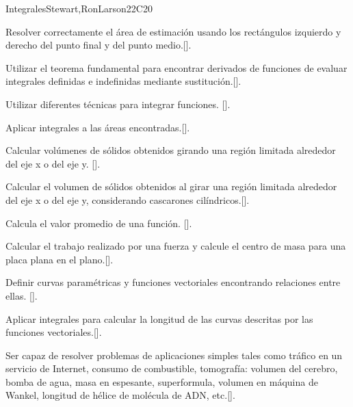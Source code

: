 \begin{syllabus}
\begin{unit}{Integrales}{}{Stewart,RonLarson}{22}{C20}
   \begin{learningoutcomes}
      \item Resolver correctamente el área de estimación usando los rectángulos izquierdo y derecho del punto final y del punto medio.[\Assessment].
      \item Utilizar el teorema fundamental para encontrar derivados de funciones de evaluar integrales definidas e indefinidas mediante sustitución.[\Assessment].
      \item Utilizar diferentes técnicas para integrar funciones. [\Assessment].
      \item Aplicar integrales a las áreas encontradas.[\Assessment].
      \item Calcular volúmenes de sólidos obtenidos girando una región limitada alrededor del eje x o del eje y. [\Assessment].
      \item Calcular el volumen de sólidos obtenidos al girar una región limitada alrededor del eje x o del eje y, considerando cascarones cilíndricos.[\Assessment].
      \item Calcula el valor promedio de una función. [\Assessment].
      \item Calcular el trabajo realizado por una fuerza y calcule el centro de masa para una placa plana en el plano.[\Assessment].
      \item Definir curvas paramétricas y funciones vectoriales encontrando relaciones entre ellas. [\Assessment].
      \item Aplicar integrales para calcular la longitud de las curvas descritas por las funciones vectoriales.[\Assessment].
      \item Ser capaz de resolver problemas de aplicaciones simples tales como tráfico en un servicio de Internet, consumo de combustible, tomografía: volumen del cerebro, bomba de agua, masa en espesante, superformula, volumen en máquina de Wankel, longitud de hélice de molécula de ADN, etc.[\Assessment].
    \end{learningoutcomes}
\end{unit}

\begin{coursebibliography}
\end{coursebibliography}

\end{syllabus}
